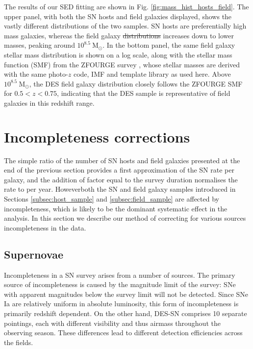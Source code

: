 \documentclass[fleqn,usenatbib]{mnras}
\providecommand{\DIFadd}[1]{{\protect\color{blue}\uwave{#1}}} %
\providecommand{\DIFdel}[1]{{\protect\color{red}\sout{#1}}}                      %
\providecommand{\DIFaddbegin}{} %
\providecommand{\DIFaddend}{} %
\providecommand{\DIFdelbegin}{} %
\providecommand{\DIFdelend}{} %
\newcommand{\DIFscaledelfig}{0.5}
\newlength{\DIFdelgraphicswidth} %
\newlength{\DIFdelgraphicsheight} %
\newcommand{\DIFaddincludegraphics}[2][]{{\color{blue}\fbox{\DIFOincludegraphics[#1]{#2}}}} %
\newcommand{\DIFdelincludegraphics}[2][]{%
\sbox{\DIFdelgraphicsbox}{\DIFOincludegraphics[#1]{#2}}%
\settoboxwidth{\DIFdelgraphicswidth}{\DIFdelgraphicsbox} %
\settoboxtotalheight{\DIFdelgraphicsheight}{\DIFdelgraphicsbox} %
\scalebox{\DIFscaledelfig}{%
\parbox[b]{\DIFdelgraphicswidth}{\usebox{\DIFdelgraphicsbox}\\[-\baselineskip] \rule{\DIFdelgraphicswidth}{0em}}\llap{\resizebox{\DIFdelgraphicswidth}{\DIFdelgraphicsheight}{%
\setlength{\unitlength}{\DIFdelgraphicswidth}%
\begin{picture}(1,1)%
\thicklines\linethickness{2pt} %
{\color[rgb]{1,0,0}\put(0,0){\framebox(1,1){}}}%
{\color[rgb]{1,0,0}\put(0,0){\line( 1,1){1}}}%
{\color[rgb]{1,0,0}\put(0,1){\line(1,-1){1}}}%
\end{picture}%
}\hspace*{3pt}}} %
} %
\DeclareRobustCommand{\DIFaddbegin}{\DIFOaddbegin \let\includegraphics\DIFaddincludegraphics} %
\DeclareRobustCommand{\DIFaddend}{\DIFOaddend \let\includegraphics\DIFOincludegraphics} %
\DeclareRobustCommand{\DIFdelbegin}{\DIFOdelbegin \let\includegraphics\DIFdelincludegraphics} %
\DeclareRobustCommand{\DIFdelend}{\DIFOaddend \let\includegraphics\DIFOincludegraphics} %
\begin{document}
The results of our SED fitting are shown in Fig. \ref{fig:mass_hist_hosts_field}. The upper panel, with both the SN hosts and field galaxies displayed, shows the vastly different distributions of the two samples. SN hosts are preferentially high mass galaxies, whereas the field galaxy \DIFdelbegin \DIFdel{distributions }\DIFdelend \DIFaddbegin \DIFadd{distribution }\DIFaddend increases down to lower masses, peaking around $10^{8.5}~\mathrm{M}_{\odot}$. In the bottom panel, the same field galaxy stellar mass distribution is shown on a log scale, along with the stellar mass function (SMF) from the ZFOURGE survey \citep{Tomczak2014}, whose stellar masses are derived with the same photo-$z$ code, IMF and template library as used here. Above $10^{8.5}~\mathrm{M}_{\odot}$, the DES field galaxy distribution closely follows the ZFOURGE SMF for $0.5<z<0.75$, indicating that the DES sample is representative of field galaxies in this redshift range.%


\section{Incompleteness corrections}
\label{sec:incompleteness}
The simple ratio of the number of SN hosts and field galaxies presented at the end of the previous section provides a first approximation of the SN rate per galaxy, and the addition of \DIFaddbegin \DIFadd{a }\DIFaddend factor equal to the survey duration normalises the rate to per year. However\DIFaddbegin \DIFadd{, }\DIFaddend both the SN and field galaxy samples introduced in Sections \ref{subsec:host_sample} and \ref{subsec:field_sample} are affected by incompleteness, which is likely to be the dominant systematic effect in the analysis. In this section we describe our method of correcting for various sources \DIFaddbegin \DIFadd{of }\DIFaddend incompleteness in the data.

\subsection{Supernovae \label{subsec:incompleteness_SNe}}

Incompleteness in a SN survey arises from a number of sources. The primary source of incompleteness is caused by the magnitude limit of the survey: SNe with apparent magnitudes below the survey limit will not be detected. Since SNe Ia are relatively uniform in absolute luminosity, this form of incompleteness is primarily redshift dependent. On the other hand, DES-SN comprises 10 separate pointings, each with different visibility and thus airmass throughout the observing season. These differences lead to different detection efficiencies across the fields.
\end{document}
